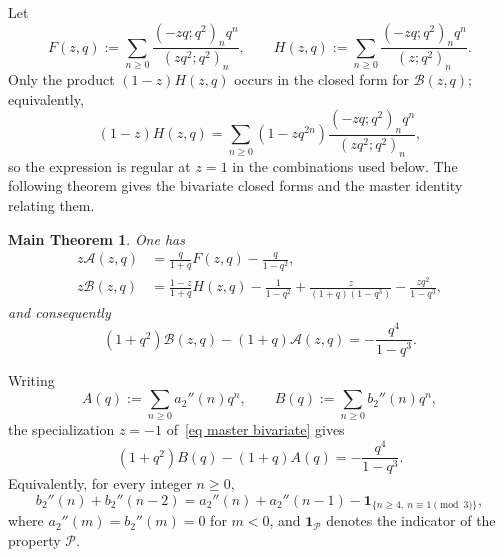 \documentclass[reqno]{amsart}
\theoremstyle{definition}
\theoremstyle{plain}
\newtheorem*{maintheorem} {Main Theorem}
\theoremstyle{remark}
\numberwithin{equation}{section}
\begin{document}
Let
\[
F(z,q):=\sum_{n\ge 0}\frac{(-zq;q^2)_n q^n}{(zq^2;q^2)_n},
\qquad
H(z,q):=\sum_{n\ge 0}\frac{(-zq;q^2)_n q^n}{(z;q^2)_n}.
\]
Only the product $(1-z)H(z,q)$ occurs in the closed form for $\mathcal B(z,q)$; equivalently,
\[
(1-z)H(z,q)=\sum_{n\ge0}(1-zq^{2n})\frac{(-zq;q^2)_nq^n}{(zq^2;q^2)_n},
\]
so the expression is regular at $z=1$ in the combinations used below.
The following theorem gives the bivariate closed forms and the master identity relating them.

\begin{maintheorem}
One has
\begin{align}
z\mathcal A(z,q)&=\frac{q}{1+q}F(z,q)-\frac{q}{1-q^2}, \label{eq zA-closed}\\
z\mathcal B(z,q)&=\frac{1-z}{1+q}H(z,q)-\frac{1}{1-q^2}
+\frac{z}{(1+q)(1-q^3)}-\frac{zq^2}{1-q^3}, \label{eq zB-closed}
\end{align}
and consequently
\begin{equation}\label{eq master bivariate}
(1+q^2)\mathcal B(z,q)-(1+q)\mathcal A(z,q)=-\frac{q^4}{1-q^3}.
\end{equation}
\end{maintheorem}


Writing
\[
A(q):=\sum_{n\ge 0} a_2''(n)q^n,\qquad B(q):=\sum_{n\ge 0} b_2''(n)q^n,
\]
the specialization $z=-1$ of~\eqref{eq master bivariate} gives
\begin{equation}\label{eq weighted relation}
(1+q^2)B(q)-(1+q)A(q)=-\frac{q^4}{1-q^3}.
\end{equation}
Equivalently, for every integer $n\ge 0$,
\begin{equation}\label{eq weighted relation coeff}
b_2''(n)+b_2''(n-2)=a_2''(n)+a_2''(n-1)-\mathbf 1_{\{n\ge4,\ n\equiv1\pmod 3\}},
\end{equation}
where $a_2''(m)=b_2''(m)=0$ for $m<0$, and $\mathbf 1_{\mathcal P}$ denotes the indicator of the property $\mathcal P$.
\end{document}

